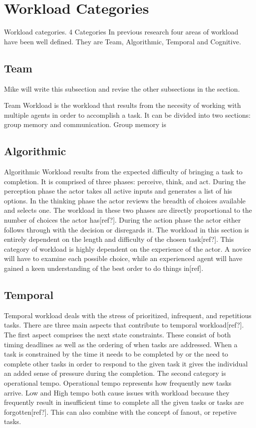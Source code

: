 \section{Workload Categories}

Workload categories.
4 Categories
	In previous research four areas of workload have been well defined. They are Team, Algorithmic, Temporal and Cognitive.
\subsection{Team}

{\sc Mike will write this subsection and revise the other subsections in the section.}

	Team Workload is the workload that results from the necesity of working with multiple agents in order to accomplish a task. It can be divided into two sections: group memory and communication. Group memory is 

\subsection{Algorithmic}
Algorithmic Workload results from the expected difficulty of bringing a task to completion. It is comprised of three phases: perceive, think, and act. During the perception phase the actor takes all active inputs and generates a list of his options. In the thinking phase the actor reviews the breadth of choices available and selects one. The workload in these two phases are directly proportional to the number of choices the actor has[ref?]. During the action phase the actor either follows through with the decision or disregards it. The workload in this section is entirely dependent on the length and difficulty of the chosen task[ref?]. This category of workload is highly dependent on the experience of the actor. A novice will have to examine each possible choice, while an experienced agent will have gained a keen understanding of the best order to do things in[ref].

\subsection{Temporal}
Temporal workload deals with the stress of prioritized, infrequent, and repetitious tasks. There are three main aspects that contribute to temporal workload[ref?]. The first aspect comprises the next state constraints. These consist of both timing deadlines as well as the ordering of when tasks are addressed. When a task is constrained by the time it needs to be completed by or the need to complete other tasks in order to respond to the given task it gives the individual an added sense of pressure during the completion. The second category is operational tempo. Operational tempo represents how frequently new tasks arrive. Low and High tempo both cause issues with workload because they frequently result in insufficient time to complete all the given tasks or tasks are forgotten[ref?]. This can also combine with the concept of fanout, or repetive tasks. 

